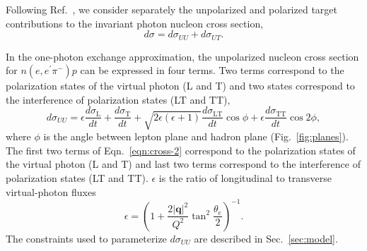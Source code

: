 Following Ref.~\cite{hermes-thesis}, we consider separately the unpolarized and
polarized target contributions to the invariant photon nucleon cross section,
\begin{equation}
  d\sigma = d\sigma_{UU} + d\sigma_{UT}.
  \label{eqn:cross-1}
\end{equation}

In the one-photon exchange approximation, the unpolarized nucleon 
cross section for $n(e,e^{\prime}\pi^{-})p$
can be expressed in four terms. Two terms correspond
to the polarization states of the virtual photon (L and T) and two states
correspond to the interference of polarization states (LT and TT),
\begin{equation}
  d\sigma_{UU} =  \epsilon  \frac{d\sigma_{\mathrm{L}}}{dt}
  + \frac{d\sigma_{\mathrm{T}}}{dt} + 
  \sqrt{2\epsilon (\epsilon +1)} \frac{d\sigma_{\mathrm{LT}}}{dt} \cos{\phi}
  + \epsilon  \frac{d\sigma_{\mathrm{TT}}}{dt} \cos{2 \phi},
  \label{eqn:cross-2}
\end{equation}
where $\phi$ is the angle between lepton plane and hadron plane
(Fig.~\ref{fig:planes}). 
The first two terms of Eqn.~\ref{eqn:cross-2} correspond to the
polarization states of the virtual photon (L and T) and last two terms
correspond to the interference of polarization states (LT and TT).  $\epsilon$
is the ratio of longitudinal to transverse virtual-photon fluxes
\begin{equation}
  \epsilon=\left(1+\frac{2
  |\mathbf{q}|^2}{Q^2} \tan^2\frac{\theta_{e}}{2} \right)^{-1}.
\end{equation}
The constraints used to parameterize $d\sigma_{UU}$ are described in
Sec.~\ref{sec:model}.

